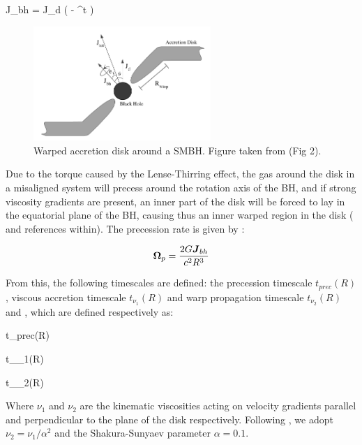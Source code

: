\documentclass[a4,useAMS,usenatbib,usegraphicx,12pt]{article}
\begin{document}
{ J_{bh} = J_d \sin( \theta - \theta^t ) }

\begin{figure}[htbp]
\centering
\includegraphics[width=0.6\textwidth]
{./figures/AccretionDisk.png}
\caption{\small{Warped accretion disk around a SMBH. Figure taken from \citet{Fanidakis2011} (Fig 2).}}

\label{fig:AccretionDisk}
\end{figure}


Due to the torque caused by the Lense-Thirring effect, the gas around the disk in a misaligned system
will precess around the rotation axis of the BH, and if strong viscosity gradients are present, an 
inner part of the disk will be forced to lay in the equatorial plane of the BH, causing thus an inner 
warped region in the disk (\cite{Fanidakis2011} and references within). The precession rate is given
by \citep{Pringle1992}:

\[ \boldsymbol{ \Omega }_p = \frac{2G\boldsymbol{ J }_{bh}}{c^2R^3} \]

From this, the following timescales are defined: the precession timescale $t_{prec}(R)$, viscous 
accretion timescale $t_{\nu_1}(R)$ and warp propagation timescale $t_{\nu_2}(R)$ and , which are 
defined respectively as:

{ t_{prec}(R) \equiv {} }

{ t_{\nu_1}(R) \equiv {} }

{ t_{\nu_2}(R) \equiv {} }


Where $\nu_1$ and $\nu_2$ are the kinematic viscosities acting on velocity gradients parallel and 
perpendicular to the plane of the disk respectively. Following \citet{Volonteri2007}, we adopt $\nu_2
= \nu_1/\alpha^2$ and the Shakura-Sunyaev parameter $\alpha = 0.1$.
\end{document}
